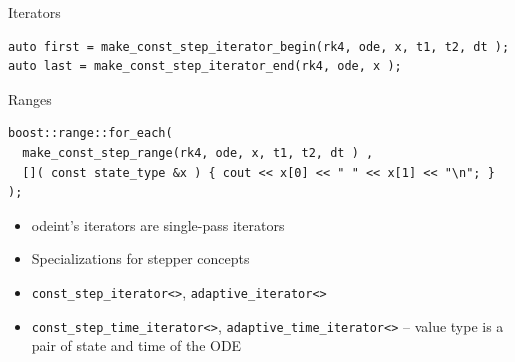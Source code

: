 \begin{frame}[fragile]


\vspace{2ex}

Iterators
\begin{lstlisting}[basicstyle=\tiny\ttfamily]
auto first = make_const_step_iterator_begin(rk4, ode, x, t1, t2, dt );
auto last = make_const_step_iterator_end(rk4, ode, x );
\end{lstlisting}

\vspace{2ex}

Ranges
\begin{lstlisting}[basicstyle=\tiny\ttfamily]
boost::range::for_each(
  make_const_step_range(rk4, ode, x, t1, t2, dt ) ,
  []( const state_type &x ) { cout << x[0] << " " << x[1] << "\n"; } );
\end{lstlisting}




\vspace{2ex}

{\small
\begin{itemize}
\item odeint's iterators are single-pass iterators
\item Specializations for stepper concepts
\item {\tt const\_step\_iterator<>}, {\tt adaptive\_iterator<>}
\item {\tt const\_step\_time\_iterator<>}, {\tt adaptive\_time\_iterator<>} -- value type is a pair of state and time of the ODE
\end{itemize}
}



\end{frame}






